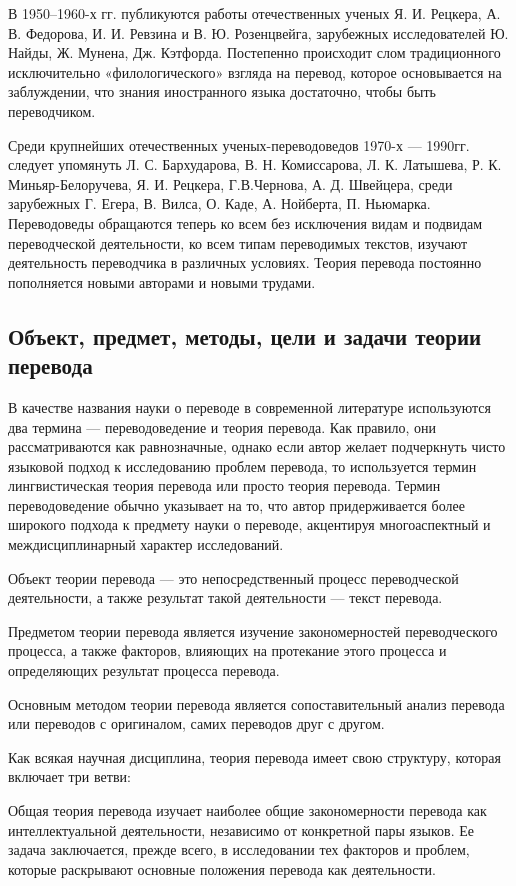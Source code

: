 В 1950--1960-х гг. публикуются работы отечественных ученых Я. И. Рецкера, А. В. Федорова, И. И. Ревзина и В. Ю. Розенцвейга, зарубежных исследователей Ю. Найды, Ж. Мунена, Дж. Кэтфорда. Постепенно происходит слом традиционного исключительно «филологического» взгляда на перевод, которое основывается на заблуждении, что знания иностранного языка достаточно, чтобы быть переводчиком.

Среди крупнейших отечественных ученых-переводоведов 1970-х --- 1990гг. следует упомянуть Л. С. Бархударова, В. Н. Комиссарова, Л. К. Латышева, Р. К. Миньяр-Белоручева, Я. И. Рецкера, Г.В.Чернова, А. Д. Швейцера, среди зарубежных Г. Егера, В. Вилса, О. Каде, А. Нойберта, П. Ньюмарка. Переводоведы обращаются теперь ко всем без исключения видам и подвидам переводческой деятельности, ко всем типам переводимых текстов, изучают деятельность       переводчика в различных условиях. Теория перевода постоянно пополняется новыми авторами и новыми трудами.

\subsection*{Объект, предмет, методы, цели и задачи теории перевода}

В качестве названия науки о переводе в современной литературе используются два термина --- переводоведение и теория перевода. Как правило, они рассматриваются как равнозначные, однако если автор желает подчеркнуть чисто языковой подход к исследованию проблем перевода, то используется термин лингвистическая теория перевода или просто теория перевода.  Термин переводоведение обычно указывает на то, что автор придерживается более широкого подхода к предмету науки о переводе, акцентируя многоаспектный и междисциплинарный характер исследований.

Объект теории перевода --- это непосредственный процесс переводческой деятельности, а также результат такой деятельности --- текст перевода.

Предметом теории перевода является изучение закономерностей переводческого процесса, а также факторов, влияющих на протекание этого процесса и определяющих результат процесса перевода.

Основным методом теории перевода является сопоставительный анализ перевода или переводов с оригиналом, самих переводов друг с другом.

Как всякая научная дисциплина, теория перевода имеет свою структуру, которая включает три ветви:

Общая теория перевода изучает наиболее общие закономерности перевода как интеллектуальной деятельности, независимо от конкретной пары языков. Ее задача заключается, прежде всего, в исследовании тех факторов и проблем, которые раскрывают основные положения перевода как деятельности.

